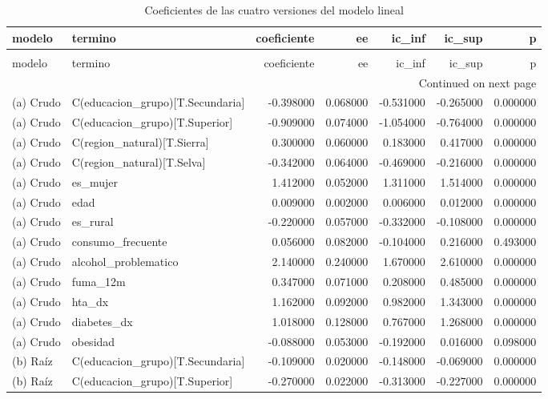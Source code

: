 \begin{longtable}{llrrrrr}
\caption{Coeficientes de las cuatro versiones del modelo lineal} \label{tab:tabla_20_coeficientes_lineales} \\
\toprule
modelo & termino & coeficiente & ee & ic\_inf & ic\_sup & p \\
\midrule
\endfirsthead
\caption[]{Coeficientes de las cuatro versiones del modelo lineal} \\
\toprule
modelo & termino & coeficiente & ee & ic\_inf & ic\_sup & p \\
\midrule
\endhead
\midrule
\multicolumn{7}{r}{Continued on next page} \\
\midrule
\endfoot
\bottomrule
\endlastfoot
(a) Crudo & C(educacion\_grupo)[T.Secundaria] & -0.398000 & 0.068000 & -0.531000 & -0.265000 & 0.000000 \\
(a) Crudo & C(educacion\_grupo)[T.Superior] & -0.909000 & 0.074000 & -1.054000 & -0.764000 & 0.000000 \\
(a) Crudo & C(region\_natural)[T.Sierra] & 0.300000 & 0.060000 & 0.183000 & 0.417000 & 0.000000 \\
(a) Crudo & C(region\_natural)[T.Selva] & -0.342000 & 0.064000 & -0.469000 & -0.216000 & 0.000000 \\
(a) Crudo & es\_mujer & 1.412000 & 0.052000 & 1.311000 & 1.514000 & 0.000000 \\
(a) Crudo & edad & 0.009000 & 0.002000 & 0.006000 & 0.012000 & 0.000000 \\
(a) Crudo & es\_rural & -0.220000 & 0.057000 & -0.332000 & -0.108000 & 0.000000 \\
(a) Crudo & consumo\_frecuente & 0.056000 & 0.082000 & -0.104000 & 0.216000 & 0.493000 \\
(a) Crudo & alcohol\_problematico & 2.140000 & 0.240000 & 1.670000 & 2.610000 & 0.000000 \\
(a) Crudo & fuma\_12m & 0.347000 & 0.071000 & 0.208000 & 0.485000 & 0.000000 \\
(a) Crudo & hta\_dx & 1.162000 & 0.092000 & 0.982000 & 1.343000 & 0.000000 \\
(a) Crudo & diabetes\_dx & 1.018000 & 0.128000 & 0.767000 & 1.268000 & 0.000000 \\
(a) Crudo & obesidad & -0.088000 & 0.053000 & -0.192000 & 0.016000 & 0.098000 \\
(b) Raíz & C(educacion\_grupo)[T.Secundaria] & -0.109000 & 0.020000 & -0.148000 & -0.069000 & 0.000000 \\
(b) Raíz & C(educacion\_grupo)[T.Superior] & -0.270000 & 0.022000 & -0.313000 & -0.227000 & 0.000000 \\

\end{longtable}
